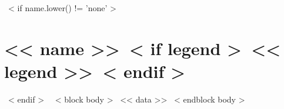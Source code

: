 ~< if name.lower() != 'none' >~
\section{<< name >>~< if legend >~\hfill{\normalsize\normalfont<< legend >>}~< endif >~}
\label{cv:<< section_id >>}
~< endif >~
  ~< block body >~
    << data >>
  ~< endblock body >~
